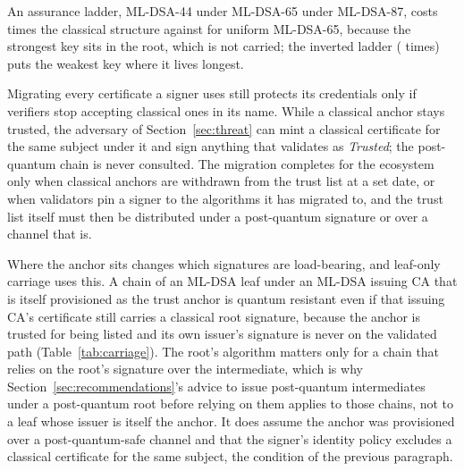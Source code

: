 An assurance ladder, ML-DSA-44 under ML-DSA-65 under ML-DSA-87, costs
\NmixLadder{} times the classical structure against \NmixFull{} for uniform
ML-DSA-65, because the strongest key sits in the root, which is not carried;
the inverted ladder (\NmixInverted{} times) puts the weakest key where it lives
longest.

Migrating every certificate a signer uses still protects its credentials only
if verifiers stop accepting classical ones in its name. While a classical
anchor stays trusted, the adversary of Section~\ref{sec:threat} can mint a
classical certificate for the same subject under it and sign anything that
validates as \emph{Trusted}; the post-quantum chain is never consulted. The
migration completes for the ecosystem only when classical anchors are
withdrawn from the trust list at a set date, or when validators pin a signer
to the algorithms it has migrated to, and the trust list itself must then be
distributed under a post-quantum signature or over a channel that is.

Where the anchor sits changes which signatures are load-bearing, and leaf-only
carriage uses this. A chain of an ML-DSA leaf under an ML-DSA issuing CA that
is itself provisioned as the trust anchor is quantum resistant even if that
issuing CA's certificate still carries a classical root signature, because the
anchor is trusted for being listed and its own issuer's signature is never on
the validated path (Table~\ref{tab:carriage}). The root's algorithm matters
only for a chain that relies on the root's signature over the intermediate,
which is why Section~\ref{sec:recommendations}'s advice to issue post-quantum
intermediates under a post-quantum root before relying on them applies to those
chains, not to a leaf whose issuer is itself the anchor. It does assume the
anchor was provisioned over a post-quantum-safe channel and that the signer's
identity policy excludes a classical certificate for the same subject, the
condition of the previous paragraph.
